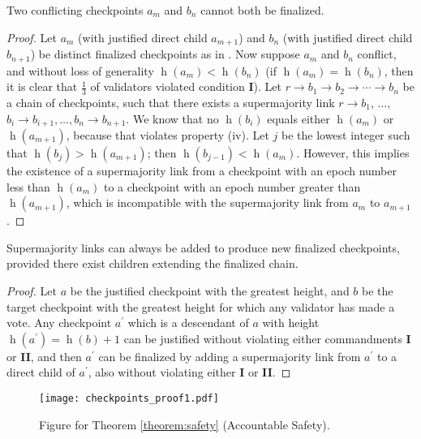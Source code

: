 \documentclass[12pt]{article}
\newcommand{\h}{\operatorname{h}\xspace}
\begin{document}
\begin{theorem}
\label{theorem:safety}
Two conflicting checkpoints $a_m$ and $b_n$ cannot both be finalized.
\begin{proof}
Let $a_m$ (with justified direct child $a_{m+1}$) and $b_n$ (with justified direct child $b_{n+1}$) be distinct finalized checkpoints as in . Now suppose $a_m$ and $b_n$ conflict, and without loss of generality $\h(a_m) < \h(b_n)$ (if $\h(a_m) = \h(b_n)$, then it is clear that $\frac{1}{3}$ of validators violated condition \textbf{I}). Let $r \rightarrow b_1 \rightarrow b_2 \rightarrow \cdots \rightarrow b_n$ be a chain of checkpoints, such that there exists a supermajority link $r \to b_1$, $\ldots$, $b_i \to b_{i+1}, \ldots, b_{n} \to b_{n+1}$.  We know that no $\h(b_i)$ equals either $\h(a_m)$ or $\h(a_{m+1})$, because that violates property (iv). Let $j$ be the lowest integer such that $\h(b_j) > \h(a_{m+1})$; then $\h(b_{j-1}) < \h(a_m)$. However, this implies the existence of a supermajority link from a checkpoint with an epoch number less than $\h(a_m)$ to a checkpoint with an epoch number greater than $\h(a_{m+1})$, which is incompatible with the supermajority link from $a_m$ to $a_{m+1}$.
\end{proof}
\end{theorem}

\begin{theorem}
\label{theorem:liveness}
Supermajority links can always be added to produce new finalized checkpoints, provided there exist children extending the finalized chain.
\begin{proof}
Let $a$ be the justified checkpoint with the greatest height, and $b$ be the target checkpoint with the greatest height for which any validator has made a vote. Any checkpoint $a^\prime$ which is a descendant of $a$ with height $\h(a^\prime) = \h(b) + 1$ can be justified without violating either commandments \textbf{I} or \textbf{II}, and then $a^\prime$ can be finalized by adding a supermajority link from $a^\prime$ to a direct child of $a^\prime$, also without violating either \textbf{I} or \textbf{II}.
\end{proof}


\end{theorem}


\begin{figure}[h!tb]
\centering
   \texttt{[image: checkpoints\_proof1.pdf]}
\caption{Figure for Theorem \ref{theorem:safety} (Accountable Safety).}
\label{fig:proof1}	
\end{figure}
\end{document}
